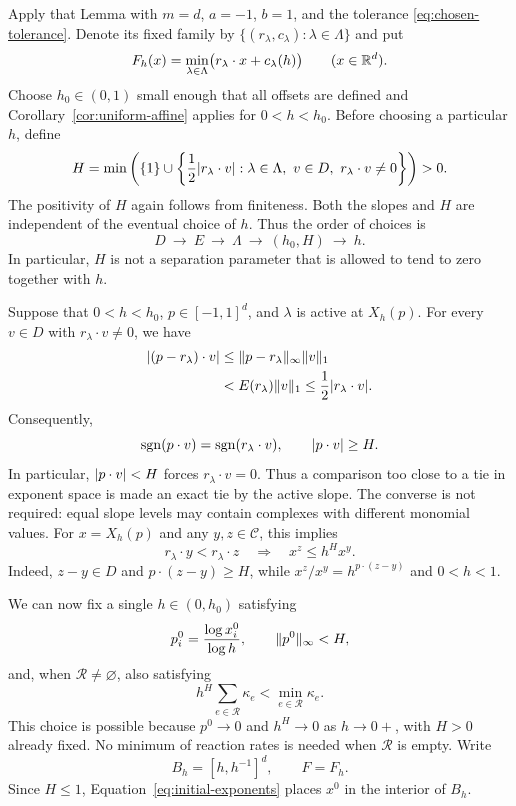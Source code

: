Apply that Lemma with $m=d$, $a=-1$, $b=1$, and the tolerance
\eqref{eq:chosen-tolerance}. Denote its fixed family by
$\{(r_\lambda,c_\lambda):\lambda\in\Lambda\}$ and put
\[
 F_h(x)=\min_{\lambda\in\Lambda}
       \bigl(r_\lambda\cdot x+c_\lambda(h)\bigr)
 \qquad(x\in\mathbb R^d).
\]
Choose $h_0\in(0,1)$ small enough that all offsets are defined and
Corollary~\ref{cor:uniform-affine} applies for $0<h<h_0$.
Before choosing a particular $h$, define
\begin{equation}\label{eq:fixed-gap}
 H=\min\left(
 \{1\}\cup
 \left\{
 \frac12\lvert r_\lambda\cdot v\rvert:
 \lambda\in\Lambda,\ v\in D,\ r_\lambda\cdot v\ne0
 \right\}\right)>0.
\end{equation}
The positivity of $H$ again follows from finiteness. Both the slopes and
$H$ are independent of the eventual choice of $h$.
Thus the order of choices is
\[
 D\ \longrightarrow\ E\ \longrightarrow\ \Lambda
 \ \longrightarrow\ (h_0,H)\ \longrightarrow\ h.
\]
In particular, $H$ is not a separation parameter that is allowed to tend
to zero together with $h$.

Suppose that $0<h<h_0$, $p\in[-1,1]^d$, and $\lambda$ is active at
$X_h(p)$. For every $v\in D$ with $r_\lambda\cdot v\ne0$, we have
\begin{align*}
 \lvert(p-r_\lambda)\cdot v\rvert
 &\le \lVert p-r_\lambda\rVert_\infty\lVert v\rVert_1\\
 &<E(r_\lambda)\lVert v\rVert_1
 \le\frac12\lvert r_\lambda\cdot v\rvert.
\end{align*}
Consequently,
\begin{equation}\label{eq:sign-and-gap}
 \operatorname{sgn}(p\cdot v)
 =\operatorname{sgn}(r_\lambda\cdot v),
 \qquad \lvert p\cdot v\rvert\ge H.
\end{equation}
In particular, $\lvert p\cdot v\rvert<H$ forces $r_\lambda\cdot v=0$.
Thus a comparison too close to a tie in exponent space is made an exact
tie by the active slope. The converse is not required: equal slope levels
may contain complexes with different monomial values.
For $x=X_h(p)$ and any $y,z\in\mathcal C$, this implies
\begin{equation}\label{eq:monomial-order}
 r_\lambda\cdot y<r_\lambda\cdot z
 \quad\Longrightarrow\quad
 x^z\le h^H x^y.
\end{equation}
Indeed, $z-y\in D$ and $p\cdot(z-y)\ge H$, while
$x^z/x^y=h^{p\cdot(z-y)}$ and $0<h<1$.

We can now fix a single $h\in(0,h_0)$ satisfying
\begin{equation}\label{eq:initial-exponents}
 p_i^0=\frac{\log x_i^0}{\log h},
 \qquad \lVert p^0\rVert_\infty<H,
\end{equation}
and, when $\mathcal R\ne\varnothing$, also satisfying
\begin{equation}\label{eq:rate-separation}
 h^H\sum_{e\in\mathcal R}\kappa_e
 <\min_{e\in\mathcal R}\kappa_e.
\end{equation}
This choice is possible because $p^0\to0$ and $h^H\to0$ as
$h\to0+$, with $H>0$ already fixed. No minimum of reaction rates is
needed when $\mathcal R$ is empty. Write
\[
 B_h=[h,h^{-1}]^d,
 \qquad F=F_h.
\]
Since $H\le1$, Equation~\eqref{eq:initial-exponents} places $x^0$ in
the interior of $B_h$.

